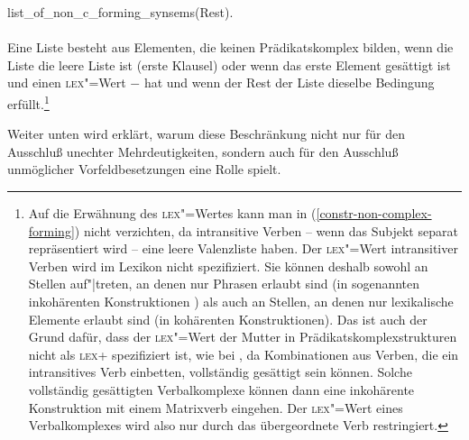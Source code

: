 \hfill        list\_of\_non\_c\_forming\_synsems(Rest).\\\\
\zs
Eine Liste besteht aus Elementen, die keinen Prädikatskomplex bilden, wenn die Liste
die leere Liste ist (erste Klausel) oder wenn das erste Element gesättigt ist
und einen \textsc{lex}"=Wert $-$ 
hat und wenn der Rest der Liste dieselbe Bedingung erfüllt.\footnote{\label{fn-lex-intransitiv}%
        Auf die Erwähnung des \textsc{lex}"=Wertes kann man in (\ref{constr-non-complex-forming}) nicht verzichten,
        da intransitive Verben -- wenn das Subjekt separat repräsentiert wird -- eine
        leere Valenzliste haben. Der \textsc{lex}"=Wert intransitiver Verben wird
        im Lexikon nicht spezifiziert. Sie können deshalb sowohl an Stellen auf"|treten,
        an denen nur Phrasen erlaubt sind (in sogenannten inkohärenten Konstruktionen \citep{Bech55a})
        als auch an Stellen, an denen nur lexikalische Elemente erlaubt sind (in kohärenten Konstruktionen).
        Das ist auch der Grund dafür, dass der \textsc{lex}"=Wert der Mutter in Prädikatskomplexstrukturen nicht als \textsc{lex}+ spezifiziert
        ist, wie \zb bei \citet{HN94a,dKM2001a}, da Kombinationen aus Verben, die ein intransitives Verb einbetten,
        vollständig gesättigt sein können. Solche vollständig gesättigten Verbalkomplexe können dann eine
        inkohärente Konstruktion mit einem Matrixverb eingehen. Der \textsc{lex}"=Wert eines Verbalkomplexes
        wird also nur durch das übergeordnete Verb restringiert.%
}

Weiter unten wird erklärt, warum diese Beschränkung nicht nur für den Ausschluß
unechter Mehrdeutigkeiten, sondern auch für den Ausschluß unmöglicher Vorfeldbesetzungen
eine Rolle spielt.

